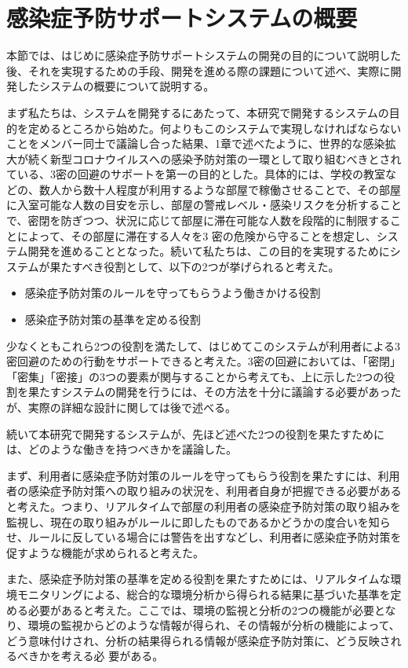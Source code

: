 \section{感染症予防サポートシステムの概要}
本節では、はじめに感染症予防サポートシステムの開発の目的について説明した後、それを実現するための手段、開発を進める際の課題について述べ、実際に開発したシステムの概要について説明する。

まず私たちは、システムを開発するにあたって、本研究で開発するシステムの目的を定めるところから始めた。何よりもこのシステムで実現しなければならないことをメンバー同士で議論し合った結果、1章で述べたように、世界的な感染拡大が続く新型コロナウイルスへの感染予防対策の一環として取り組むべきとされている、3密の回避のサポートを第一の目的とした。具体的には、学校の教室などの、数人から数十人程度が利用するような部屋で稼働させることで、その部屋に入室可能な人数の目安を示し、部屋の警戒レベル・感染リスクを分析することで、密閉を防ぎつつ、状況に応じて部屋に滞在可能な人数を段階的に制限することによって、その部屋に滞在する人々を3 密の危険から守ることを想定し、システム開発を進めることとなった。続いて私たちは、この目的を実現するためにシステムが果たすべき役割として、以下の2つが挙げられると考えた。


\begin{itemize}
	\item 感染症予防対策のルールを守ってもらうよう働きかける役割
	\item 感染症予防対策の基準を定める役割
\end{itemize}

少なくともこれら2つの役割を満たして、はじめてこのシステムが利用者による3密回避のための行動をサポートできると考えた。3密の回避においては、「密閉」「密集」「密接」の3つの要素が関与することから考えても、上に示した2つの役割を果たすシステムの開発を行うには、その方法を十分に議論する必要があったが、実際の詳細な設計に関しては後で述べる。

続いて本研究で開発するシステムが、先ほど述べた2つの役割を果たすためには、どのような働きを持つべきかを議論した。

まず、利用者に感染症予防対策のルールを守ってもらう役割を果たすには、利用者の感染症予防対策への取り組みの状況を、利用者自身が把握できる必要があると考えた。つまり、リアルタイムで部屋の利用者の感染症予防対策の取り組みを監視し、現在の取り組みがルールに即したものであるかどうかの度合いを知らせ、ルールに反している場合には警告を出すなどし、利用者に感染症予防対策を促すような機能が求められると考えた。

また、感染症予防対策の基準を定める役割を果たすためには、リアルタイムな環境モニタリングによる、総合的な環境分析から得られる結果に基づいた基準を定める必要があると考えた。ここでは、環境の監視と分析の2つの機能が必要となり、環境の監視からどのような情報が得られ、その情報が分析の機能によって、どう意味付けされ、分析の結果得られる情報が感染症予防対策に、どう反映されるべきかを考える必
要がある。

